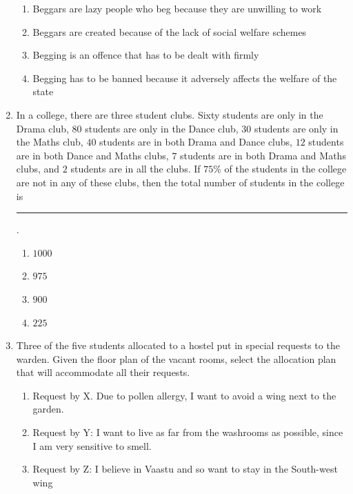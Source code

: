 \documentclass[journal,12pt,onecolumn]{IEEEtran}
\theoremstyle{remark}
\begin{document}
\begin{enumerate}
\hfill{}
    \begin{enumerate}
        \item Beggars are lazy people who beg because they are unwilling to work
        \item Beggars are created because of the lack of social welfare schemes
        \item Begging is an offence that has to be dealt with firmly
        \item Begging has to be banned because it adversely affects the welfare of the state
    \end{enumerate}
    
    \item In a college, there are three student clubs. Sixty students are only in the Drama club, $80$ students are only in the Dance club, $30$ students are only in the Maths club, $40$ students are in both Drama and Dance clubs, $12$ students are in both Dance and Maths clubs, $7$ students are in both Drama and Maths clubs, and $2$ students are in all the clubs. If $75$\% of the students in the college are not in any of these clubs, then the total number of students in the college is \rule{1cm}{0.1mm}.
    
\hfill{}
\begin{multicols}{4}
    \begin{enumerate}
        \item $1000$
        \item $975$
        \item $900$
        \item $225$
    \end{enumerate}
\end{multicols}
\newpage
    \item Three of the five students allocated to a hostel put in special requests to the warden. Given the floor plan of the vacant rooms, select the allocation plan that will accommodate all their requests.
   
\begin{enumerate}[label = ]
    \item Request by X. Due to pollen allergy, I want to avoid a wing next to the garden. 

    \item Request by Y: I want to live as far from the washrooms as possible, since I am very sensitive to smell.

    \item Request by Z: I believe in Vaastu and so want to stay in the South-west wing
\end{enumerate}


\end{enumerate}
\end{document}
